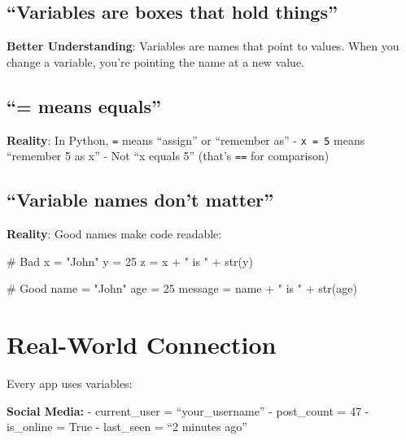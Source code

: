 \documentclass[
  letterpaper,
  DIV=11,
  numbers=noendperiod,
  oneside]{scrreprt}
\newenvironment{Shaded}{}{}
\newcommand{\BuiltInTok}[1]{\textcolor[rgb]{0.84,0.23,0.29}{#1}}
\newcommand{\CommentTok}[1]{\textcolor[rgb]{0.42,0.45,0.49}{#1}}
\newcommand{\DecValTok}[1]{\textcolor[rgb]{0.00,0.36,0.77}{#1}}
\newcommand{\NormalTok}[1]{\textcolor[rgb]{0.14,0.16,0.18}{#1}}
\newcommand{\OperatorTok}[1]{\textcolor[rgb]{0.14,0.16,0.18}{#1}}
\newcommand{\StringTok}[1]{\textcolor[rgb]{0.01,0.18,0.38}{#1}}
\begin{document}
\subsection{``Variables are boxes that hold
things''}\label{variables-are-boxes-that-hold-things}

\textbf{Better Understanding}: Variables are names that point to values.
When you change a variable, you're pointing the name at a new value.

\subsection{``= means equals''}\label{means-equals}

\textbf{Reality}: In Python, \texttt{=} means ``assign'' or ``remember
as'' - \texttt{x\ =\ 5} means ``remember 5 as x'' - Not ``x equals 5''
(that's \texttt{==} for comparison)

\subsection{``Variable names don't
matter''}\label{variable-names-dont-matter}

\textbf{Reality}: Good names make code readable:

\begin{Shaded}
\begin{Highlighting}[]
\CommentTok{\# Bad}
\NormalTok{x }\OperatorTok{=} \StringTok{"John"}
\NormalTok{y }\OperatorTok{=} \DecValTok{25}
\NormalTok{z }\OperatorTok{=}\NormalTok{ x }\OperatorTok{+} \StringTok{" is "} \OperatorTok{+} \BuiltInTok{str}\NormalTok{(y)}

\CommentTok{\# Good  }
\NormalTok{name }\OperatorTok{=} \StringTok{"John"}
\NormalTok{age }\OperatorTok{=} \DecValTok{25}
\NormalTok{message }\OperatorTok{=}\NormalTok{ name }\OperatorTok{+} \StringTok{" is "} \OperatorTok{+} \BuiltInTok{str}\NormalTok{(age)}
\end{Highlighting}
\end{Shaded}

\section{Real-World Connection}\label{real-world-connection-1}

Every app uses variables:

\textbf{Social Media:} - current\_user = ``your\_username'' -
post\_count = 47 - is\_online = True - last\_seen = ``2 minutes ago''
\end{document}
